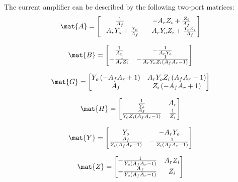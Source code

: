 \documentclass[a4paper, 12pt]{article}
\begin{document}
The current amplifier can be described by the following two-port
matrices:
\begin{equation}
\mat{A} = \left[\begin{matrix}\frac{1}{A_{f}} & - A_{r} Z_{i} + \frac{Z_{i}}{A_{f}}\\- A_{r} Y_{o} + \frac{Y_{o}}{A_{f}} & - A_{r} Y_{o} Z_{i} + \frac{Y_{o} Z_{i}}{A_{f}}\end{matrix}\right]
\end{equation}

\begin{equation}
\mat{B} = \left[\begin{matrix}\frac{1}{A_{r}} & - \frac{1}{A_{r} Y_{o}}\\- \frac{1}{A_{r} Z_{i}} & - \frac{1}{A_{r} Y_{o} Z_{i} \left(A_{f} A_{r} - 1\right)}\end{matrix}\right]
\end{equation}

\begin{equation}
\mat{G} = \left[\begin{matrix}Y_{o} \left(- A_{f} A_{r} + 1\right) & A_{r} Y_{o} Z_{i} \left(A_{f} A_{r} - 1\right)\\A_{f} & Z_{i} \left(- A_{f} A_{r} + 1\right)\end{matrix}\right]
\end{equation}

\begin{equation}
\mat{H} = \left[\begin{matrix}\frac{1}{Y_{o}} & A_{r}\\\frac{A_{f}}{Y_{o} Z_{i} \left(A_{f} A_{r} - 1\right)} & \frac{1}{Z_{i}}\end{matrix}\right]
\end{equation}

\begin{equation}
\mat{Y} = \left[\begin{matrix}Y_{o} & - A_{r} Y_{o}\\\frac{A_{f}}{Z_{i} \left(A_{f} A_{r} - 1\right)} & - \frac{1}{Z_{i} \left(A_{f} A_{r} - 1\right)}\end{matrix}\right]
\end{equation}

\begin{equation}
\mat{Z} = \left[\begin{matrix}- \frac{1}{Y_{o} \left(A_{f} A_{r} - 1\right)} & A_{r} Z_{i}\\- \frac{A_{f}}{Y_{o} \left(A_{f} A_{r} - 1\right)} & Z_{i}\end{matrix}\right]
\end{equation}
\end{document}
